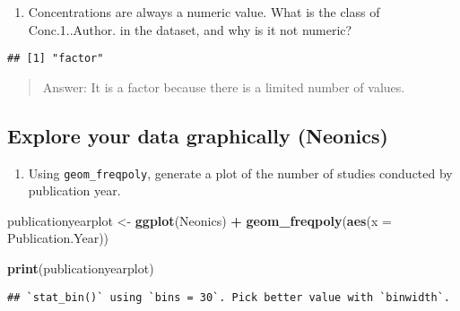\documentclass[]{article}
\newenvironment{Shaded}{\begin{snugshade}}{\end{snugshade}}
\newcommand{\DataTypeTok}[1]{\textcolor[rgb]{0.13,0.29,0.53}{#1}}
\newcommand{\DecValTok}[1]{\textcolor[rgb]{0.00,0.00,0.81}{#1}}
\newcommand{\KeywordTok}[1]{\textcolor[rgb]{0.13,0.29,0.53}{\textbf{#1}}}
\newcommand{\NormalTok}[1]{#1}
\newcommand{\OperatorTok}[1]{\textcolor[rgb]{0.81,0.36,0.00}{\textbf{#1}}}
\newcommand{\StringTok}[1]{\textcolor[rgb]{0.31,0.60,0.02}{#1}}
\providecommand{\tightlist}{%
  \setlength{\itemsep}{0pt}\setlength{\parskip}{0pt}}
\begin{document}
\begin{enumerate}
\def\labelenumi{\arabic{enumi}.}
\setcounter{enumi}{7}
\tightlist
\item
  Concentrations are always a numeric value. What is the class of
  Conc.1..Author. in the dataset, and why is it not numeric?
\end{enumerate}

\begin{Shaded}
\end{Shaded}

\begin{verbatim}
## [1] "factor"
\end{verbatim}

\begin{quote}
Answer: It is a factor because there is a limited number of values.
\end{quote}

\hypertarget{explore-your-data-graphically-neonics}{%
\subsection{Explore your data graphically
(Neonics)}\label{explore-your-data-graphically-neonics}}

\begin{enumerate}
\def\labelenumi{\arabic{enumi}.}
\setcounter{enumi}{8}
\tightlist
\item
  Using \texttt{geom\_freqpoly}, generate a plot of the number of
  studies conducted by publication year.
\end{enumerate}

\begin{Shaded}
\begin{Highlighting}[]
\NormalTok{publicationyearplot <-}\StringTok{ }\KeywordTok{ggplot}\NormalTok{(Neonics) }\OperatorTok{+}
\StringTok{  }\KeywordTok{geom_freqpoly}\NormalTok{(}\KeywordTok{aes}\NormalTok{(}\DataTypeTok{x =}\NormalTok{ Publication.Year))}

\KeywordTok{print}\NormalTok{(publicationyearplot)}
\end{Highlighting}
\end{Shaded}

\begin{verbatim}
## `stat_bin()` using `bins = 30`. Pick better value with `binwidth`.
\end{verbatim}
\end{document}
